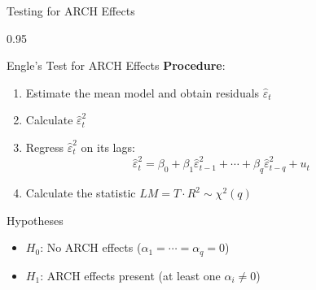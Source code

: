 \documentclass[9pt, aspectratio=169, t]{beamer}
\begin{document}
\begin{frame}{Testing for ARCH Effects}
    \begin{cminipage}{0.95\textwidth}
    \begin{block}{Engle's Test for ARCH Effects}
        \textbf{Procedure}:
        \begin{enumerate}\setlength{\itemsep}{0pt}
            \item Estimate the mean model and obtain residuals $\hat{\varepsilon}_t$
            \item Calculate $\hat{\varepsilon}_t^2$
            \item Regress $\hat{\varepsilon}_t^2$ on its lags:
            \[
                \hat{\varepsilon}_t^2 = \beta_0 + \beta_1 \hat{\varepsilon}_{t-1}^2 + \cdots + \beta_q \hat{\varepsilon}_{t-q}^2 + u_t
            \]
            \item Calculate the statistic $LM = T \cdot R^2 \sim \chi^2(q)$
        \end{enumerate}
    \end{block}

    \vspace{0.3cm}

    \begin{alertblock}{Hypotheses}
        \begin{itemize}\setlength{\itemsep}{0pt}
            \item $H_0$: No ARCH effects ($\alpha_1 = \cdots = \alpha_q = 0$)
            \item $H_1$: ARCH effects present (at least one $\alpha_i \neq 0$)
        \end{itemize}
    \end{alertblock}
    \end{cminipage}
\end{frame}
\end{document}
